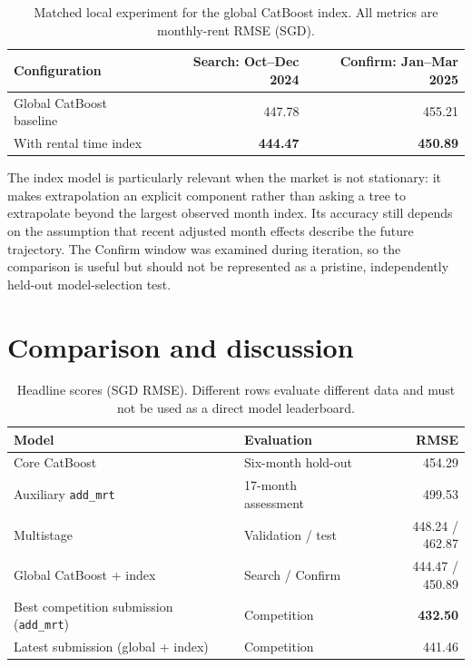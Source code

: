 \documentclass[10pt,a4paper]{article}
\begin{document}
\begin{table}[htbp]\centering\small
\caption{Matched local experiment for the global CatBoost index. All metrics are monthly-rent RMSE (SGD).}\label{tab:indexablation}
\begin{tabular}{lrr}\toprule Configuration & Search: Oct--Dec 2024 & Confirm: Jan--Mar 2025\\\midrule
Global CatBoost baseline & 447.78 & 455.21\\
With rental time index & \textbf{444.47} & \textbf{450.89}\\\bottomrule\end{tabular}\end{table}

The index model is particularly relevant when the market is not stationary: it makes extrapolation an explicit component rather than asking a tree to extrapolate beyond the largest observed month index. Its accuracy still depends on the assumption that recent adjusted month effects describe the future trajectory. The Confirm window was examined during iteration, so the comparison is useful but should not be represented as a pristine, independently held-out model-selection test.


\section{Comparison and discussion}\label{sec:discussion}
\begin{table}[htbp]\centering\small
\caption{Headline scores (SGD RMSE). Different rows evaluate different data and must not be used as a direct model leaderboard.}\label{tab:headline}
\begin{tabularx}{\linewidth}{@{}Xl r@{}}\toprule
Model & Evaluation & RMSE\\\midrule
Core CatBoost & Six-month hold-out & 454.29\\
Auxiliary \texttt{add\_mrt} & 17-month assessment & 499.53\\
Multistage & Validation / test & 448.24 / 462.87\\
Global CatBoost + index & Search / Confirm & 444.47 / 450.89\\
Best competition submission (\texttt{add\_mrt}) & Competition & \textbf{432.50}\\
Latest submission (global + index) & Competition & 441.46\\\bottomrule
\end{tabularx}\end{table}
\end{document}
